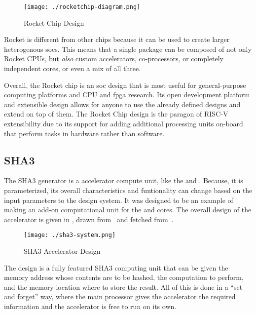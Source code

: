 \begin{figure}[h!tbp]
  \centering
  \texttt{[image: ./rocketchip-diagram.png]}
  \caption{Rocket Chip Design~\cite{rocketChipPaper}}
  \label{fig:Rocket_Chip_Design}
\end{figure}

Rocket is different from other chips because it can be used to create larger heterogenous \glspl{soc}.
This means that a single package can be composed of not only Rocket CPUs, but \emph{also} custom \glspl{accelerator}, co-processors, or completely independent cores, or even a mix of all three.

Overall, the Rocket chip is an \gls{soc} design that is most useful for general-purpose computing platforms and CPU and \gls{fpga} research.
Its open development platform and \gls{extensible} design allows for anyone to use the already defined designs and extend on top of them.
The Rocket Chip design is the paragon of RISC-V extensibility due to its support for adding additional processing units on-board that perform tasks in hardware rather than software.

\subsection{SHA3}\label{sec:SHA3_Accelerators_Generator}
\nocite{sha3Paper}
\nocite{sha3Github}
The SHA3 generator is a  \gls{accelerator} compute unit, like the  and .
Because, it is parameterized, its overall characteristics and funtionality can change based on the input parameters to the design system.
It was designed to be an example of making an add-on computational unit for the  and  cores.
The overall design of the \gls{accelerator} is given in , drawn from~\cite{sha3Paper} and fetched from~\cite{sha3Github}.

\begin{figure}[h!tbp]
  \centering
  \texttt{[image: ./sha3-system.png]}
  \caption{SHA3 Accelerator Design~\cite[p.~3]{sha3Paper}}
  \label{fig:SHA3_Accelerator_Design}
\end{figure}

The design is a fully featured SHA3 computing unit that can be given the memory address whose contents are to be hashed, the computation to perform, and the memory location where to store the result.
All of this is done in a ``set and forget'' way, where the main processor gives the \gls{accelerator} the required information and the accelerator is free to run on its own.

